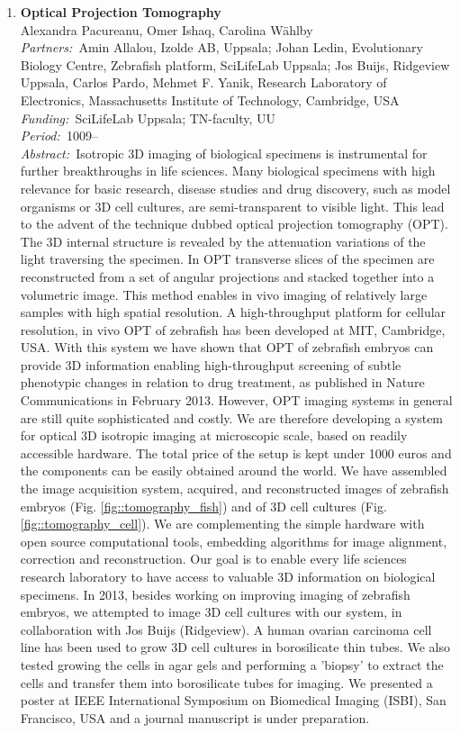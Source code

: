 \documentclass[10pt, a4paper]{article}
\newcommand{\aabstract}[1]{\emph{Abstract:~}#1}
\newcommand{\ffunding}[1]{\emph{Funding:~}#1\\}
\newcommand{\ppartners}[1]{\emph{Partners:~}#1\\}
\newcommand{\pperiod}[1]{\emph{Period:~}#1\\}
\begin{document}
\begin{enumerate}
\item \textbf{Optical Projection Tomography}\\
Alexandra Pacureanu, Omer Ishaq, Carolina W\"{a}hlby\\
\ppartners{Amin Allalou, Izolde AB, Uppsala; Johan Ledin, Evolutionary Biology Centre, Zebrafish platform, SciLifeLab Uppsala; Jos Buijs, Ridgeview Uppsala, Carlos Pardo, Mehmet F. Yanik, Research Laboratory of Electronics, Massachusetts Institute of Technology, Cambridge, USA}
\ffunding{SciLifeLab Uppsala; TN-faculty, UU}
\pperiod{1009--}
\aabstract{Isotropic 3D imaging of biological specimens is instrumental for further breakthroughs in life sciences. Many biological specimens with high relevance for basic research, disease studies and drug discovery, such as model organisms or 3D cell cultures, are semi-transparent to visible light. This lead to the advent of the technique dubbed optical projection tomography (OPT). The 3D internal structure is revealed by the attenuation variations of the light traversing the specimen. In OPT transverse slices of the specimen are reconstructed from a set of angular projections and stacked together into a volumetric image. This method enables in vivo imaging of relatively large samples with high spatial resolution. A high-throughput platform for cellular resolution, in vivo OPT of zebrafish has been developed at MIT, Cambridge, USA. With this system we have shown that OPT of zebrafish embryos can provide 3D information enabling high-throughput screening of subtle phenotypic changes in relation to drug treatment, as published in Nature Communications in February 2013. However, OPT imaging systems in general are still quite sophisticated and costly. We are therefore developing a system for optical 3D isotropic imaging at microscopic scale, based on readily accessible hardware. The total price of the setup is kept under 1000 euros and the components can be easily obtained around the world. We have assembled the image acquisition system, acquired, and reconstructed images of zebrafish embryos (Fig. \ref{fig::tomography_fish}) and of 3D cell cultures (Fig. \ref{fig::tomography_cell}). We are complementing the simple hardware with open source computational tools, embedding algorithms for image alignment, correction and reconstruction. Our goal is to enable every life sciences research laboratory to have access to valuable 3D information on biological specimens.
In 2013, besides working on improving imaging of zebrafish embryos, we attempted to image 3D cell cultures with our system, in collaboration with Jos Buijs (Ridgeview). A human ovarian carcinoma cell line has been used to grow 3D cell cultures in borosilicate thin tubes. We also tested growing the cells in agar gels and performing a 'biopsy' to extract the cells and transfer them into borosilicate tubes for imaging. We presented a poster at IEEE International Symposium on Biomedical Imaging (ISBI), San Francisco, USA and a journal manuscript is under preparation.}


\end{enumerate}
\end{document}
